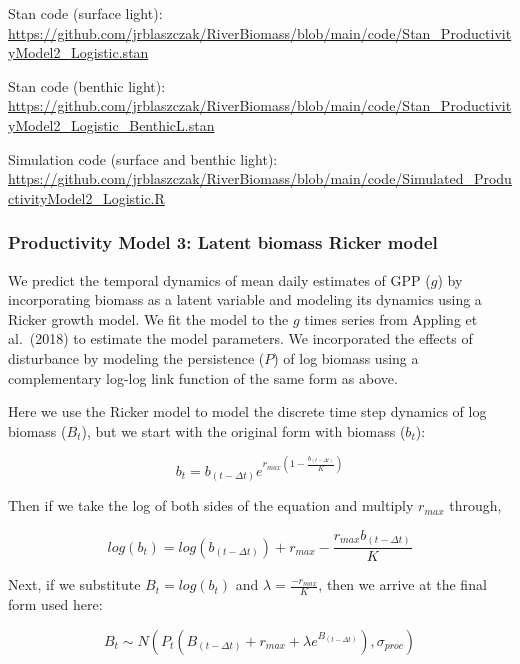 \documentclass[
]{article}
\begin{document}
Stan code (surface light):
\url{https://github.com/jrblaszczak/RiverBiomass/blob/main/code/Stan_ProductivityModel2_Logistic.stan}

Stan code (benthic light):
\url{https://github.com/jrblaszczak/RiverBiomass/blob/main/code/Stan_ProductivityModel2_Logistic_BenthicL.stan}

Simulation code (surface and benthic light):
\url{https://github.com/jrblaszczak/RiverBiomass/blob/main/code/Simulated_ProductivityModel2_Logistic.R}

\hypertarget{productivity-model-3-latent-biomass-ricker-model}{%
\subsubsection{Productivity Model 3: Latent biomass Ricker
model}\label{productivity-model-3-latent-biomass-ricker-model}}

We predict the temporal dynamics of mean daily estimates of GPP (\(g\))
by incorporating biomass as a latent variable and modeling its dynamics
using a Ricker growth model. We fit the model to the \(g\) times series
from Appling et al.~(2018) to estimate the model parameters. We
incorporated the effects of disturbance by modeling the persistence
(\(P\)) of log biomass using a complementary log-log link function of
the same form as above.

Here we use the Ricker model to model the discrete time step dynamics of
log biomass (\(B_t\)), but we start with the original form with biomass
(\(b_t\)):

\begin{equation}
    b_{t} = b_{(t-\Delta t)}e^{r_{max}(1-\frac{b_{(t-\Delta t)}}{K})}
\end{equation}

Then if we take the log of both sides of the equation and multiply
\(r_{max}\) through,

\begin{equation}
    log(b_{t}) = log(b_{(t-\Delta t)})+r_{max}-\frac{r_{max}b_{(t-\Delta t)}}{K}
\end{equation}

Next, if we substitute \(B_t = log(b_t)\) and
\(\lambda = \frac{-r_{max}}{K}\), then we arrive at the final form used
here:

\begin{equation}
    B_{t} \sim N(P_{t}(B_{(t-\Delta t)} + r_{max} + \lambda e^{B_{(t-\Delta t)}}), \sigma_{proc})
\end{equation}
\end{document}
